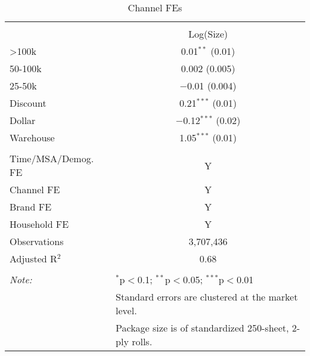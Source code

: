
\begin{table}[!htbp] \centering 
  \caption{Channel FEs} 
  \label{tab:tpFEs} 
\begin{tabular}{@{\extracolsep{5pt}}lc} 
\\[-1.8ex]\hline 
\hline \\[-1.8ex] 
 & Log(Size) \\ 
 >100k & 0.01$^{**}$ (0.01) \\ 
  50-100k & 0.002 (0.005) \\ 
  25-50k & $-$0.01 (0.004) \\ 
  Discount & 0.21$^{***}$ (0.01) \\ 
  Dollar & $-$0.12$^{***}$ (0.02) \\ 
  Warehouse & 1.05$^{***}$ (0.01) \\ 
 \hline \\[-1.8ex] 
Time/MSA/Demog. FE & Y \\ 
Channel FE & Y \\ 
Brand FE & Y \\ 
Household FE & Y \\ 
Observations & 3,707,436 \\ 
Adjusted R$^{2}$ & 0.68 \\ 
\hline 
\hline \\[-1.8ex] 
\textit{Note:}  & \multicolumn{1}{l}{$^{*}$p$<$0.1; $^{**}$p$<$0.05; $^{***}$p$<$0.01} \\ 
 & \multicolumn{1}{l}{Standard errors are clustered at the market level.} \\ 
 & \multicolumn{1}{l}{Package size is of standardized 250-sheet, 2-ply rolls.} \\ 
\end{tabular} 
\end{table} 
